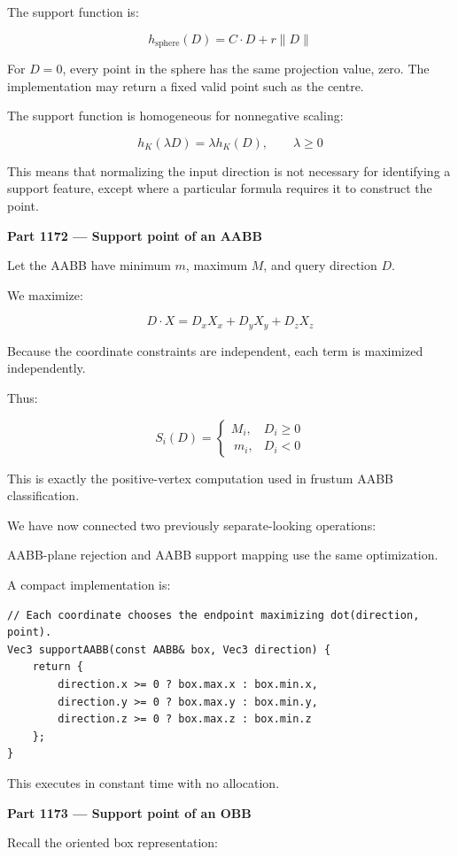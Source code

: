 The support function is:

\[
\boxed{ h_{\mathrm{sphere}}(D)=C\cdot D+r\|D\| }
\]

For \(D=0\), every point in the sphere has the same projection value, zero. The implementation may return a fixed valid point such as the centre.

The support function is homogeneous for nonnegative scaling:

\[
h_K(\lambda D)=\lambda h_K(D),\qquad\lambda\ge0
\]

This means that normalizing the input direction is not necessary for identifying a support feature, except where a particular formula requires it to construct the point.

\textbf{Part 1172 --- Support point of an AABB}

Let the AABB have minimum \(m\), maximum \(M\), and query direction \(D\).

We maximize:

\[
D\cdot X=D_xX_x+D_yX_y+D_zX_z
\]

Because the coordinate constraints are independent, each term is maximized independently.

Thus:

\[
\boxed{ S_i(D)= \begin{cases} M_i,&D_i\ge0\\\ m_i,&D_i<0 \end{cases} }
\]

This is exactly the positive-vertex computation used in frustum AABB classification.

We have now connected two previously separate-looking operations:

AABB-plane rejection and AABB support mapping use the same optimization.

A compact implementation is:

\begin{verbatim}
// Each coordinate chooses the endpoint maximizing dot(direction, point).
Vec3 supportAABB(const AABB& box, Vec3 direction) {
    return {
        direction.x >= 0 ? box.max.x : box.min.x,
        direction.y >= 0 ? box.max.y : box.min.y,
        direction.z >= 0 ? box.max.z : box.min.z
    };
}
\end{verbatim}

This executes in constant time with no allocation.

\textbf{Part 1173 --- Support point of an OBB}

Recall the oriented box representation:

